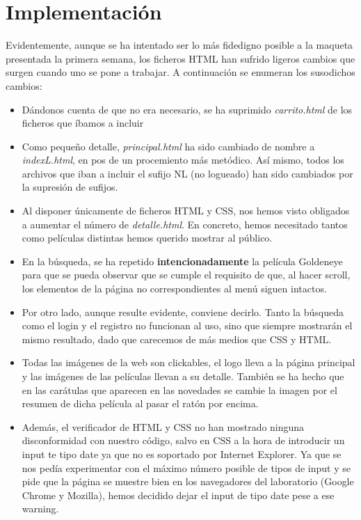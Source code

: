 \documentclass[]{article}
\begin{document}
\section{Implementación}
Evidentemente, aunque se ha intentado ser lo más fidedigno posible a la maqueta presentada la primera semana, los ficheros HTML han sufrido ligeros cambios que surgen cuando uno se pone a trabajar. A continuación se enumeran los susodichos cambios:
\begin{itemize}
	\item Dándonos cuenta de que no era necesario, se ha suprimido \textit{carrito.html} de los ficheros que íbamos a incluir
	\item Como pequeño detalle, \textit{principal.html} ha sido cambiado de nombre a \textit{indexL.html}, en pos de un procemiento más metódico. Así mismo, todos los archivos que iban a incluir el sufijo NL (no logueado) han sido cambiados por la supresión de sufijos.
	\item Al disponer únicamente de ficheros HTML y CSS, nos hemos visto obligados a aumentar el número de \textit{detalle.html}. En concreto, hemos necesitado tantos como películas distintas hemos querido mostrar al público.

	\item En la búsqueda, se ha repetido \textbf{intencionadamente} la película Goldeneye para que se pueda observar que se cumple el requisito de que, al hacer scroll, los elementos de la página no correspondientes al menú siguen intactos.

	\item Por otro lado, aunque resulte evidente, conviene decirlo. Tanto la búsqueda como el login y el registro no funcionan al uso, sino que siempre mostrarán el mismo resultado, dado que carecemos de más medios que CSS y HTML.
	
	\item Todas las imágenes de la web son clickables, el logo lleva a la página principal y las imágenes de las películas llevan a su detalle. También se ha hecho que en las carátulas que aparecen en las novedades se cambie la imagen por el resumen de dicha película al pasar el ratón por encima.

	\item Además, el verificador de HTML y CSS no han mostrado ninguna disconformidad con nuestro código, salvo en CSS a la hora de introducir un input te tipo date ya que no es soportado por Internet Explorer. Ya que se nos pedía experimentar con el máximo número posible de tipos de input y se pide que la página se muestre bien en los navegadores del laboratorio (Google Chrome y Mozilla), hemos decidido dejar el input de tipo date pese a ese warning.


\end{itemize}
\end{document}
